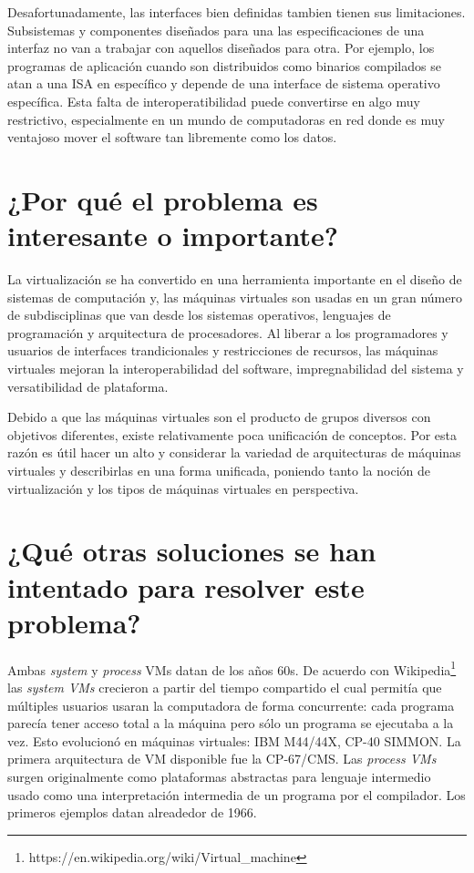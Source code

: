 Desafortunadamente, las interfaces bien definidas tambien tienen sus limitaciones. Subsistemas y componentes diseñados para una las especificaciones de una interfaz no van a trabajar con aquellos diseñados para otra. Por ejemplo, los programas de aplicación cuando son distribuidos como binarios compilados se atan a una ISA en específico y depende de una interface de sistema operativo específica. Esta falta de interoperatibilidad puede convertirse en algo muy restrictivo, especialmente en un mundo de computadoras en red donde es muy ventajoso mover el software tan libremente como los datos. 

\section{¿Por qué el problema es interesante o importante?}
La virtualización se ha convertido en una herramienta importante en el diseño de sistemas de computación y, las máquinas virtuales son usadas en un gran número de subdisciplinas que van desde los sistemas operativos, lenguajes de programación y arquitectura de procesadores. Al liberar a los programadores y usuarios de interfaces trandicionales y restricciones de recursos, las máquinas virtuales mejoran la interoperabilidad del software, impregnabilidad del sistema y versatibilidad de plataforma.

Debido a que las máquinas virtuales son el producto de grupos diversos con objetivos diferentes, existe relativamente poca unificación de conceptos. Por esta razón es útil hacer un alto y considerar la variedad de arquitecturas de máquinas virtuales y describirlas en una forma unificada, poniendo tanto la noción de virtualización y los tipos de máquinas virtuales en perspectiva.


\section{¿Qué otras soluciones se han intentado para resolver este problema?}
Ambas \emph{system} y \emph{process} VMs datan de los años 60s. De acuerdo con Wikipedia\footnote{https://en.wikipedia.org/wiki/Virtual\_machine} las \emph{system VMs} crecieron a partir del tiempo compartido el cual permitía que múltiples usuarios usaran la computadora de forma concurrente: cada programa parecía tener acceso total a la máquina pero sólo un programa se ejecutaba a la vez. Esto evolucionó en máquinas virtuales: IBM M44/44X, CP-40 SIMMON. La primera arquitectura de VM disponible fue la CP-67/CMS. Las \emph{process VMs} surgen originalmente como plataformas abstractas para lenguaje intermedio usado como una interpretación intermedia de un programa por el compilador. Los primeros ejemplos datan alreadedor de 1966. 
     
